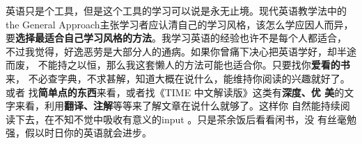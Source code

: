 英语只是个工具，但是这个工具的学习可以说是永无止境。现代英语教学法中的the
General Approach主张学习者应认清自己的学习风格，该怎么学应因人而异，
要\textbf{选择最适合自己学习风格的方法}。我学习英语的经验也许不是每个人都适合，
不过我觉得，好逸恶劳是大部分人的通病。如果你曾痛下决心把英语学好，却半途而废，
不能持之以恒，那么我这套懒人的方法可能也适合你。只要找你\textbf{爱看的书}来，
不必查字典，不求甚解，知道大概在说什么，能维持你阅读的兴趣就好了。或者
找\textbf{简单点的东西}来看，或者找《TIME 中文解读版》这类有\textbf{深度、优
  美}的文字来看，利用\textbf{翻译、注解}等等来了解文章在说什么就够了。这样你
自然能持续阅读下去，在不知不觉中吸收有意义的input 。只是茶余饭后看看闲书，没
有丝毫勉强，假以时日你的英语就会进步。




